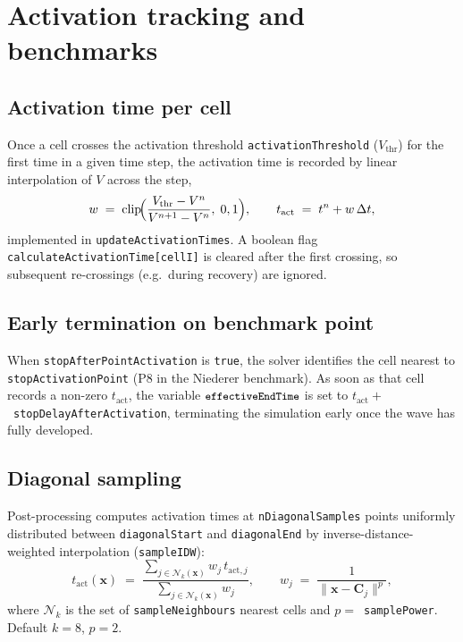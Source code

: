 \documentclass[11pt,a4paper]{article}
\newcommand{\code}[1]{\texttt{\small #1}}
\begin{document}
\section{Activation tracking and benchmarks}

\subsection{Activation time per cell}

Once a cell crosses the activation threshold \code{activationThreshold}
($V_{\text{thr}}$) for the first time in a given time step, the
activation time is recorded by linear interpolation of $V$ across the
step,
\begin{equation}
  w \;=\; \mathrm{clip}\!\Bigl(
      \frac{V_{\text{thr}} - V^{n}}{V^{n+1} - V^{n}},
      \; 0, 1
    \Bigr),
   \qquad
   t_{\text{act}} \;=\; t^{n} + w\, \Delta t,
   \label{eq:tact}
\end{equation}
implemented in \code{updateActivationTimes}. A boolean flag
\code{calculateActivationTime[cellI]} is cleared after the first
crossing, so subsequent re-crossings (e.g.\ during recovery) are
ignored.

\subsection{Early termination on benchmark point}

When \code{stopAfterPointActivation} is \code{true}, the solver
identifies the cell nearest to \code{stopActivationPoint} (P8 in the
Niederer benchmark). As soon as that cell records a non-zero
$t_{\text{act}}$, the variable $\code{effectiveEndTime}$ is set to
$t_{\text{act}} + $~\code{stopDelayAfterActivation}, terminating the
simulation early once the wave has fully developed.

\subsection{Diagonal sampling}

Post-processing computes activation times at \code{nDiagonalSamples}
points uniformly distributed between \code{diagonalStart} and
\code{diagonalEnd} by inverse-distance-weighted interpolation
(\code{sampleIDW}):
\begin{equation}
  t_{\text{act}}(\mathbf{x}) \;=\;
   \frac{\sum_{j \in \mathcal{N}_{k}(\mathbf{x})}
         w_{j}\, t_{\text{act}, j}}
        {\sum_{j \in \mathcal{N}_{k}(\mathbf{x})} w_{j}},
   \qquad
   w_{j} \;=\; \frac{1}{\lVert \mathbf{x} - \mathbf{C}_{j} \rVert^{p}},
\end{equation}
where $\mathcal{N}_{k}$ is the set of \code{sampleNeighbours} nearest
cells and $p = $~\code{samplePower}. Default $k = 8$, $p = 2$.
\end{document}
